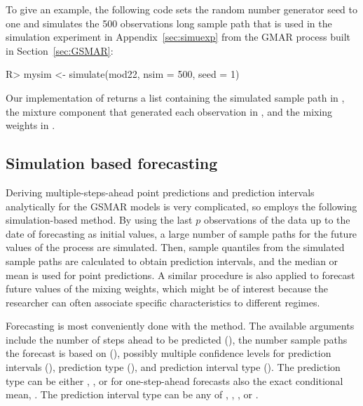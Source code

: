 \documentclass[nojss]{jss} %
\begin{document}
To give an example, the following code sets the random number generator seed to one and simulates the 500 observations long sample path that is used in the simulation experiment in Appendix~\ref{sec:simuexp} from the GMAR process built in Section~\ref{sec:GSMAR}:
%
\begin{CodeChunk}
\begin{CodeInput}
R> mysim <- simulate(mod22, nsim = 500, seed = 1)
\end{CodeInput}
\end{CodeChunk}
%
Our implementation of  returns a list containing the simulated sample path in , the mixture component that generated each observation in , and the mixing weights in .

\subsection{Simulation based forecasting}

Deriving multiple-steps-ahead point predictions and prediction intervals analytically for the GSMAR models is very complicated, so  employs the following simulation-based method. By using the last $p$ observations of the data up to the date of forecasting as initial values, a large number of sample paths for the future values of the process are simulated. Then, sample quantiles from the simulated sample paths are calculated to obtain prediction intervals, and the median or mean is used for point predictions. A similar procedure is also applied to forecast future values of the mixing weights, which might be of interest because the researcher can often associate specific characteristics to different regimes.

Forecasting is most conveniently done with the  method. The available arguments include the number of steps ahead to be predicted (), the number sample paths the forecast is based on (), possibly multiple confidence levels for prediction intervals (), prediction type (), and prediction interval type (). The prediction type can be either , , or for one-step-ahead forecasts also the exact conditional mean, . The prediction interval type can be any of , , , or .
\end{document}
